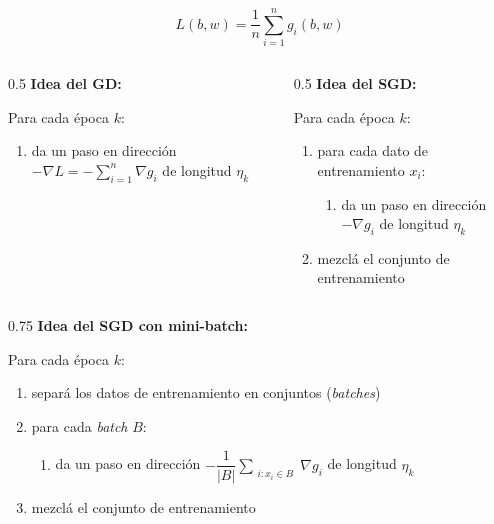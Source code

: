 \documentclass[aspectratio=169, usenames,dvipsnames]{beamer}
\begin{document}
\begin{frame}
    
    \[L(b, w) = \dfrac{1}{n} \sum_{i=1}^n g_i(b,w)\]

    \vspace{0.5cm }
    \begin{columns}
    \begin{column}[t]{0.5\textwidth}
        \textbf{Idea del GD:}
    
        Para cada época $k$:
        \begin{enumerate}
            \item da un paso en dirección $-\nabla L = -\sum_{i=1}^n \nabla g_i$ de longitud $\eta_k$
        \end{enumerate}
    \end{column}
    \pause
    \begin{column}[t]{0.5\textwidth}
        \textbf{Idea del SGD:} 
    
        Para cada época $k$:
        \begin{enumerate}
            \item para cada dato de entrenamiento $x_i$:
            \begin{enumerate}
                \item da un paso en dirección $-\nabla g_i$ de longitud $\eta_k$
            \end{enumerate}
            \item mezclá el conjunto de entrenamiento
        \end{enumerate}
    \end{column}        
    \end{columns}
\end{frame}

\begin{frame}
    \begin{columns}
    \begin{column}[t]{0.75\textwidth}
        \textbf{Idea del SGD con mini-batch:} 
        
        Para cada época $k$:
        \begin{enumerate}
            \item separá los datos de entrenamiento en conjuntos (\textit{batches})
            \item para cada \textit{batch} $B$:
            \begin{enumerate}
                \item da un paso en dirección $-\dfrac{1}{|B|}\displaystyle\sum_{\substack{i: x_i\in B}}\nabla g_i$ de longitud $\eta_k$
            \end{enumerate}
            \item mezclá el conjunto de entrenamiento
        \end{enumerate}
    \end{column}        
    \end{columns}
\end{frame}
\end{document}
